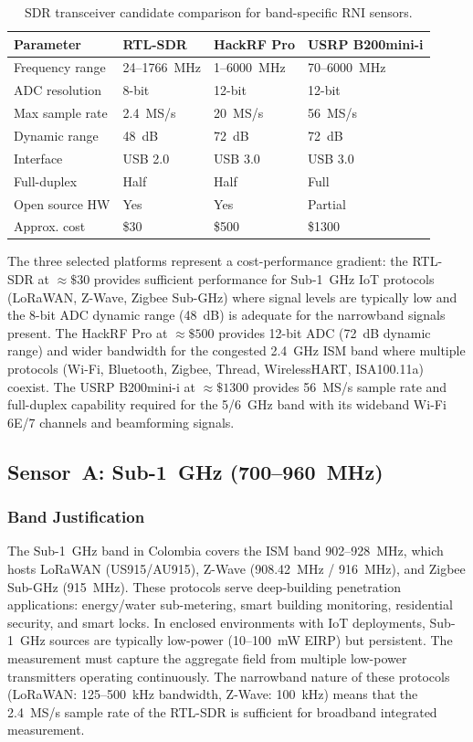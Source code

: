\documentclass[11pt,a4paper]{article}
\begin{document}
\begin{table}[ht]
\centering
\caption{SDR transceiver candidate comparison for band-specific RNI sensors.}
\label{tab:sdr_candidates}
\small
\begin{tabular}{L{2.8cm} C{3.0cm} C{3.0cm} C{3.0cm}}
\toprule
\textbf{Parameter} & \textbf{RTL-SDR} & \textbf{HackRF Pro} & \textbf{USRP B200mini-i} \\
\midrule
Frequency range & 24--1766~MHz & 1--6000~MHz & 70--6000~MHz \\
ADC resolution & 8-bit & 12-bit & 12-bit \\
Max sample rate & 2.4~MS/s & 20~MS/s & 56~MS/s \\
Dynamic range & 48~dB & 72~dB & 72~dB \\
Interface & USB 2.0 & USB 3.0 & USB 3.0 \\
Full-duplex & Half & Half & Full \\
Open source HW & Yes & Yes & Partial \\
Approx. cost & \$30 & \$500 & \$1300 \\
\bottomrule
\end{tabular}
\end{table}

\noindent The three selected platforms represent a cost-performance gradient: the RTL-SDR at $\approx \$30$ provides sufficient performance for Sub-1~GHz IoT protocols (LoRaWAN, Z-Wave, Zigbee Sub-GHz) where signal levels are typically low and the 8-bit ADC dynamic range (48~dB) is adequate for the narrowband signals present. The HackRF Pro at $\approx \$500$ provides 12-bit ADC (72~dB dynamic range) and wider bandwidth for the congested 2.4~GHz ISM band where multiple protocols (Wi-Fi, Bluetooth, Zigbee, Thread, WirelessHART, ISA100.11a) coexist. The USRP B200mini-i at $\approx \$1300$ provides 56~MS/s sample rate and full-duplex capability required for the 5/6~GHz band with its wideband Wi-Fi 6E/7 channels and beamforming signals.

\subsection{Sensor~A: Sub-1~GHz (700--960~MHz)}

\subsubsection{Band Justification}

The Sub-1~GHz band in Colombia covers the ISM band 902--928~MHz, which hosts LoRaWAN (US915/AU915), Z-Wave (908.42~MHz / 916~MHz), and Zigbee Sub-GHz (915~MHz). These protocols serve deep-building penetration applications: energy/water sub-metering, smart building monitoring, residential security, and smart locks. In enclosed environments with IoT deployments, Sub-1~GHz sources are typically low-power (10--100~mW EIRP) but persistent. The measurement must capture the aggregate field from multiple low-power transmitters operating continuously. The narrowband nature of these protocols (LoRaWAN: 125--500~kHz bandwidth, Z-Wave: 100~kHz) means that the 2.4~MS/s sample rate of the RTL-SDR is sufficient for broadband integrated measurement.
\end{document}
